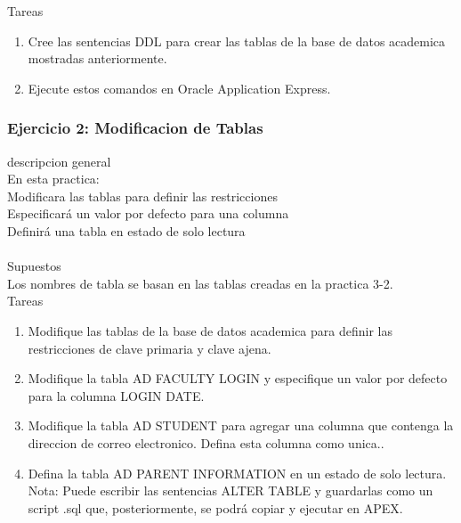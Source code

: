 \documentclass[12pt,letterpaper]{article}
\begin{document}
Tareas\\
\begin{enumerate}[1.]
    \item  Cree las sentencias DDL para crear las tablas de la base de datos academica mostradas anteriormente.  
     
    \item Ejecute estos comandos en Oracle Application Express.
    
		\end{enumerate} 
		
		
		
		\subsubsection{Ejercicio 2: Modificacion de Tablas} 
descripcion general  \\
En esta practica:\\
Modificara las tablas para definir las restricciones\\
Especificará un valor por defecto para una columna\\
Definirá una tabla en estado de solo lectura\\
 \\
Supuestos\\
Los nombres de tabla se basan en las tablas creadas en la practica 3-2.\\


Tareas\\
\begin{enumerate}[1.]
    \item  Modifique las tablas de la base de datos academica para definir las restricciones de clave primaria y clave ajena.  
     
    \item Modifique la tabla AD FACULTY LOGIN y especifique un valor por defecto para la columna LOGIN DATE.
    
    \item Modifique la tabla AD STUDENT para agregar una columna que contenga la direccion de correo electronico. Defina esta columna como unica..
    
    \item Defina la tabla AD PARENT INFORMATION en un estado de solo lectura.\\
    Nota: Puede escribir las sentencias ALTER TABLE y guardarlas como un script .sql que, posteriormente, se podrá copiar y ejecutar en APEX.
    
    
		\end{enumerate} 
		
\end{document}
